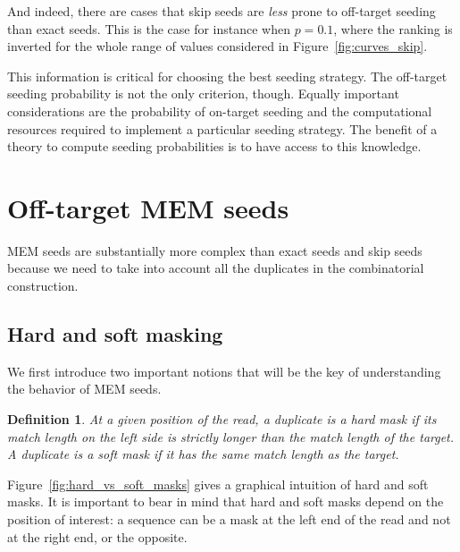 \documentclass{article}
\newtheorem{definition}{Definition}
\begin{document}
And indeed, there are cases that skip seeds are \emph{less} prone to
off-target seeding than exact seeds. This is the case for instance when
$p=0.1$, where the ranking is inverted for the whole range of values
considered in Figure~\ref{fig:curves_skip}.

This information is critical for choosing the best seeding strategy. The
off-target seeding probability is not the only criterion, though. Equally
important considerations are the probability of on-target seeding and the
computational resources required to implement a particular seeding
strategy. The benefit of a theory to compute seeding probabilities is to
have access to this knowledge.


\section{Off-target MEM seeds}

MEM seeds are substantially more complex than exact seeds and skip seeds
because we need to take into account all the duplicates in the
combinatorial construction.


\subsection{Hard and soft masking}

We first introduce two important notions that will be the key of
understanding the behavior of MEM seeds.

\begin{definition}
At a given position of the read, a duplicate is a \emph{hard mask} if its
match length on the left side is strictly longer than the match length
of the target. A duplicate is a \emph{soft mask} if it has the same match
length as the target.
\end{definition}

Figure~\ref{fig:hard_vs_soft_masks} gives a graphical intuition of hard and
soft masks. It is important to bear in mind that hard and soft masks
depend on the position of interest: a sequence can be a mask at the left
end of the read and not at the right end, or the opposite.
\end{document}
